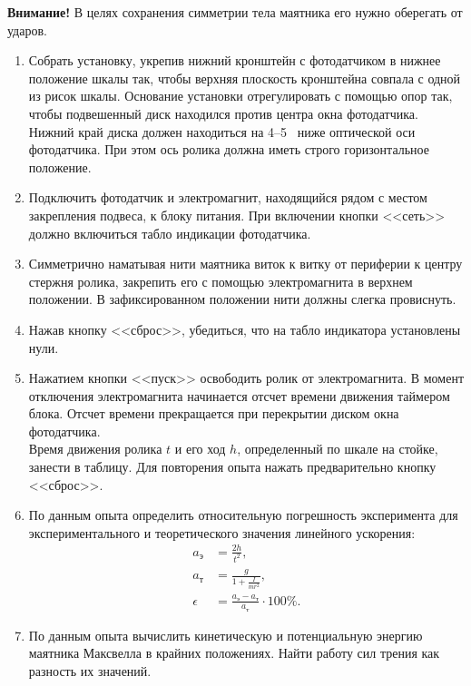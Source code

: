\documentclass[a4paper, 12pt]{extarticle}
\newcommand{\eps}{\epsilon}
\begin{document}
\textbf{Внимание!} В целях сохранения симметрии тела маятника его нужно оберегать от ударов. %
\begin{enumerate}
\item Собрать установку, укрепив нижний кронштейн с фотодатчиком в нижнее положение шкалы так, чтобы верхняя плоскость кронштейна совпала с одной из рисок шкалы. Основание установки отрегулировать с помощью опор так, чтобы подвешенный диск находился против центра окна фотодатчика. Нижний край диска должен находиться на 4--5~ ниже оптической оси фотодатчика. При этом ось ролика должна иметь строго горизонтальное положение.
\item Подключить фотодатчик и электромагнит, находящийся рядом с местом закрепления подвеса, к блоку питания. При включении кнопки <<сеть>> должно включиться табло индикации фотодатчика.
\item Симметрично наматывая нити маятника виток к витку от периферии к центру стержня ролика, закрепить его с помощью электромагнита в верхнем положении. В зафиксированном положении нити должны слегка провиснуть.
\item Нажав кнопку <<сброс>>, убедиться, что на табло индикатора установлены нули.
\item Нажатием кнопки <<пуск>> освободить ролик от электромагнита. В момент отключения электромагнита начинается отсчет времени движения таймером блока. Отсчет времени прекращается при перекрытии диском окна фотодатчика. \\
Время движения ролика $t$ и его ход $h$, определенный по шкале на стойке, занести в таблицу. Для повторения опыта нажать предварительно кнопку <<сброс>>. 
\item По данным опыта определить относительную погрешность эксперимента для экспериментального и теоретического значения линейного ускорения:
\begin{align*}
a_\text{э} &= \frac{2h}{t^2}, \\%
a_\text{т} &= \frac{g}{1 + \frac{I}{mr^2}}, \\
\eps &= \frac{a_\text{э} - a_\text{т}}{a_\text{т}} \cdot 100 \%. %
\end{align*}
\item По данным опыта вычислить кинетическую и потенциальную энергию маятника Максвелла в крайних положениях. Найти работу сил трения как разность их значений.
\end{enumerate}
\end{document}
